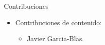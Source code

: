 \begin{frame}[t]{Contribuciones}
\begin{itemize}
  \item Contribuciones de contenido:
    \begin{itemize}
      \item Javier Garcia-Blas.
    \end{itemize}
\end{itemize}
\end{frame}
